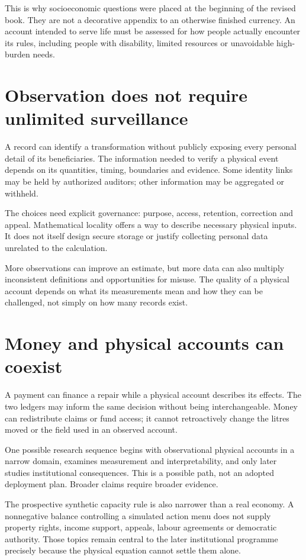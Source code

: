 This is why socioeconomic questions were placed at the beginning of the revised book. They are not a decorative appendix to an otherwise finished currency. An account intended to serve life must be assessed for how people actually encounter its rules, including people with disability, limited resources or unavoidable high-burden needs.

\section{Observation does not require unlimited surveillance}
A record can identify a transformation without publicly exposing every personal detail of its beneficiaries. The information needed to verify a physical event depends on its quantities, timing, boundaries and evidence. Some identity links may be held by authorized auditors; other information may be aggregated or withheld.

The choices need explicit governance: purpose, access, retention, correction and appeal. Mathematical locality offers a way to describe necessary physical inputs. It does not itself design secure storage or justify collecting personal data unrelated to the calculation.

More observations can improve an estimate, but more data can also multiply inconsistent definitions and opportunities for misuse. The quality of a physical account depends on what its measurements mean and how they can be challenged, not simply on how many records exist.

\section{Money and physical accounts can coexist}
A payment can finance a repair while a physical account describes its effects. The two ledgers may inform the same decision without being interchangeable. Money can redistribute claims or fund access; it cannot retroactively change the litres moved or the field used in an observed account.

One possible research sequence begins with observational physical accounts in a narrow domain, examines measurement and interpretability, and only later studies institutional consequences. This is a possible path, not an adopted deployment plan. Broader claims require broader evidence.

The prospective synthetic capacity rule is also narrower than a real economy. A nonnegative balance controlling a simulated action menu does not supply property rights, income support, appeals, labour agreements or democratic authority. Those topics remain central to the later institutional programme precisely because the physical equation cannot settle them alone.

